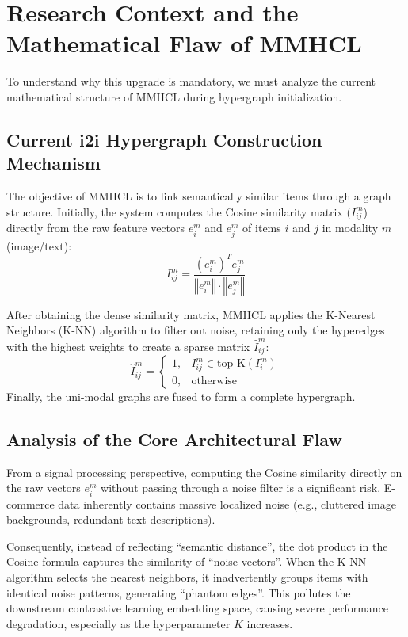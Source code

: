 \documentclass[12pt, a4paper]{article}
\begin{document}
\section{Research Context and the Mathematical Flaw of MMHCL}
To understand why this upgrade is mandatory, we must analyze the current mathematical structure of MMHCL during hypergraph initialization.

\subsection{Current i2i Hypergraph Construction Mechanism}
The objective of MMHCL is to link semantically similar items through a graph structure. Initially, the system computes the Cosine similarity matrix ($I_{ij}^{m}$) directly from the raw feature vectors $e_i^m$ and $e_j^m$ of items $i$ and $j$ in modality $m$ (image/text):
\begin{equation}
I_{ij}^{m} = \frac{(e_i^m)^T e_j^m}{\left\Vert e_i^m \right\Vert \cdot \left\Vert e_j^m \right\Vert}
\end{equation}

After obtaining the dense similarity matrix, MMHCL applies the K-Nearest Neighbors (K-NN) algorithm to filter out noise, retaining only the hyperedges with the highest weights to create a sparse matrix $\hat{I}_{ij}^{m}$:
\begin{equation}
\hat{I}_{ij}^{m} = \begin{cases} 1, & I_{ij}^{m} \in \text{top-K}(I_i^m) \\ 0, & \text{otherwise} \end{cases}
\end{equation}
Finally, the uni-modal graphs are fused to form a complete hypergraph.

\subsection{Analysis of the Core Architectural Flaw}
From a signal processing perspective, computing the Cosine similarity directly on the raw vectors $e_i^m$ without passing through a noise filter is a significant risk. E-commerce data inherently contains massive localized noise (e.g., cluttered image backgrounds, redundant text descriptions).

Consequently, instead of reflecting ``semantic distance'', the dot product in the Cosine formula captures the similarity of ``noise vectors''. When the K-NN algorithm selects the nearest neighbors, it inadvertently groups items with identical noise patterns, generating ``phantom edges''. This pollutes the downstream contrastive learning embedding space, causing severe performance degradation, especially as the hyperparameter $K$ increases.
\end{document}
